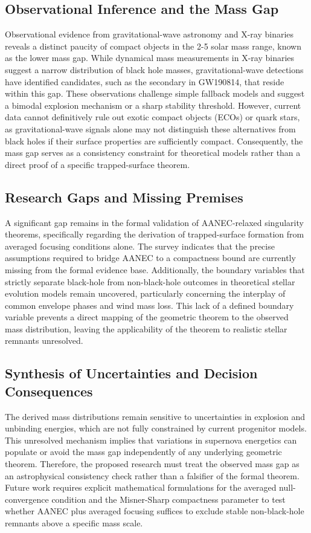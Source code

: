 \documentclass[conference]{IEEEtran}
\begin{document}
\subsection{Observational Inference and the Mass Gap}
Observational evidence from gravitational-wave astronomy and X-ray binaries reveals a distinct paucity of compact objects in the 2-5 solar mass range, known as the lower mass gap. While dynamical mass measurements in X-ray binaries suggest a narrow distribution of black hole masses, gravitational-wave detections have identified candidates, such as the secondary in GW190814, that reside within this gap. These observations challenge simple fallback models and suggest a bimodal explosion mechanism or a sharp stability threshold. However, current data cannot definitively rule out exotic compact objects (ECOs) or quark stars, as gravitational-wave signals alone may not distinguish these alternatives from black holes if their surface properties are sufficiently compact. Consequently, the mass gap serves as a consistency constraint for theoretical models rather than a direct proof of a specific trapped-surface theorem.~\cite{cite_cbbced417410bc6c,cite_07d6df5d6978a1fc}

\subsection{Research Gaps and Missing Premises}
A significant gap remains in the formal validation of AANEC-relaxed singularity theorems, specifically regarding the derivation of trapped-surface formation from averaged focusing conditions alone. The survey indicates that the precise assumptions required to bridge AANEC to a compactness bound are currently missing from the formal evidence base. Additionally, the boundary variables that strictly separate black-hole from non-black-hole outcomes in theoretical stellar evolution models remain uncovered, particularly concerning the interplay of common envelope phases and wind mass loss. This lack of a defined boundary variable prevents a direct mapping of the geometric theorem to the observed mass distribution, leaving the applicability of the theorem to realistic stellar remnants unresolved.

\subsection{Synthesis of Uncertainties and Decision Consequences}
The derived mass distributions remain sensitive to uncertainties in explosion and unbinding energies, which are not fully constrained by current progenitor models. This unresolved mechanism implies that variations in supernova energetics can populate or avoid the mass gap independently of any underlying geometric theorem. Therefore, the proposed research must treat the observed mass gap as an astrophysical consistency check rather than a falsifier of the formal theorem. Future work requires explicit mathematical formulations for the averaged null-convergence condition and the Misner-Sharp compactness parameter to test whether AANEC plus averaged focusing suffices to exclude stable non-black-hole remnants above a specific mass scale.
\end{document}
